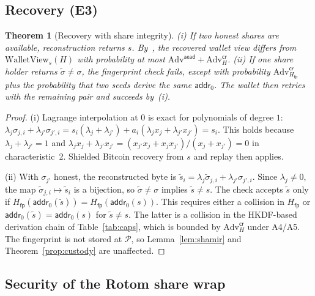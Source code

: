 \documentclass[11pt]{article}
\newtheorem{theorem}{Theorem}
\theoremstyle{remark}
\newcommand{\SB}{Shielded Bitcoin}
\begin{document}
\subsection{Recovery (E3)}

\begin{theorem}[Recovery with share integrity]
\label{thm:rec}
(i) If two honest shares are available, reconstruction returns $s$. By~\cite[Lemma~3]{sb26}, the recovered wallet view differs from $\mathrm{WalletView}_s(H)$ with probability at most $\mathrm{Adv}^{\mathsf{aead}} + \mathrm{Adv}^{\mathsf{cr}}_H$.
(ii) If one share holder returns $\tilde\sigma \ne \sigma$, the fingerprint check fails, except with probability $\mathrm{Adv}^{\mathsf{cr}}_{H_{\mathsf{fp}}}$ plus the probability that two seeds derive the same $\mathsf{addr}_0$. The wallet then retries with the remaining pair and succeeds by~(i).
\end{theorem}
\begin{proof}
(i) Lagrange interpolation at $0$ is exact for polynomials of degree $1$: $\lambda_j\sigma_{j,i} + \lambda_{j'}\sigma_{j',i} = s_i(\lambda_j + \lambda_{j'}) + a_i(\lambda_j x_j + \lambda_{j'} x_{j'}) = s_i$. This holds because $\lambda_j + \lambda_{j'} = 1$ and $\lambda_j x_j + \lambda_{j'} x_{j'} = (x_{j'}x_j + x_j x_{j'})/(x_j + x_{j'}) = 0$ in characteristic~2. \SB{} recovery from $s$ and replay then applies.

(ii) With $\sigma_{j'}$ honest, the reconstructed byte is $\tilde s_i = \lambda_j \tilde\sigma_{j,i} + \lambda_{j'}\sigma_{j',i}$. Since $\lambda_j \ne 0$, the map $\tilde\sigma_{j,i} \mapsto \tilde s_i$ is a bijection, so $\tilde\sigma \ne \sigma$ implies $\tilde s \ne s$. The check accepts $\tilde s$ only if $H_{\mathsf{fp}}(\mathsf{addr}_0(\tilde s)) = H_{\mathsf{fp}}(\mathsf{addr}_0(s))$. This requires either a collision in $H_{\mathsf{fp}}$ or $\mathsf{addr}_0(\tilde s) = \mathsf{addr}_0(s)$ for $\tilde s \neq s$. The latter is a collision in the HKDF-based derivation chain of Table~\ref{tab:caps}, which is bounded by $\mathrm{Adv}^{\mathsf{cr}}_H$ under A4/A5. The fingerprint is not stored at $\mathcal{P}$, so Lemma~\ref{lem:shamir} and Theorem~\ref{prop:custody} are unaffected.
\end{proof}

\subsection{Security of the Rotom share wrap}
\label{sec:rwproof}
\end{document}
